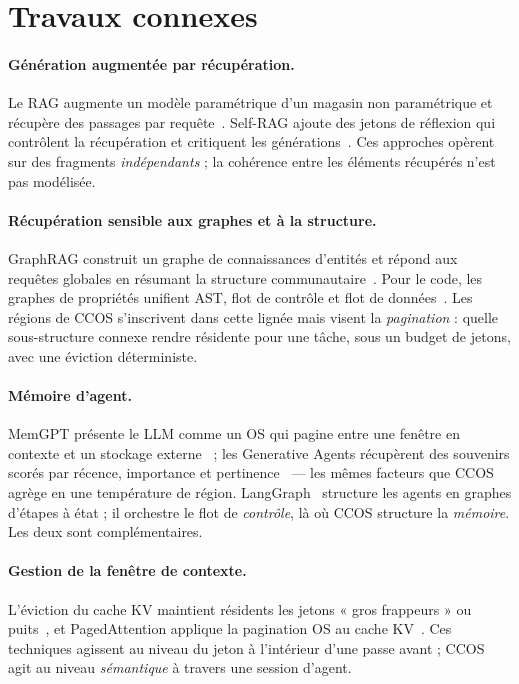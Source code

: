 \documentclass[11pt]{article}
\begin{document}
\section{Travaux connexes}\label{sec:related}

\paragraph{Génération augmentée par récupération.} Le RAG augmente un modèle
paramétrique d'un magasin non paramétrique et récupère des passages par
requête~\cite{lewis2020rag}. Self-RAG ajoute des jetons de réflexion qui contrôlent
la récupération et critiquent les générations~\cite{asai2023selfrag}. Ces approches
opèrent sur des fragments \emph{indépendants} ; la cohérence entre les éléments
récupérés n'est pas modélisée.

\paragraph{Récupération sensible aux graphes et à la structure.} GraphRAG construit
un graphe de connaissances d'entités et répond aux requêtes globales en résumant la
structure communautaire~\cite{edge2024graphrag}. Pour le code, les graphes de
propriétés unifient AST, flot de contrôle et flot de données~\cite{yamaguchi2014cpg}.
Les régions de CCOS s'inscrivent dans cette lignée mais visent la \emph{pagination} :
quelle sous-structure connexe rendre résidente pour une tâche, sous un budget de
jetons, avec une éviction déterministe.

\paragraph{Mémoire d'agent.} MemGPT présente le LLM comme un OS qui pagine entre une
fenêtre en contexte et un stockage externe~\cite{packer2023memgpt} ; les Generative
Agents récupèrent des souvenirs scorés par récence, importance et
pertinence~\cite{park2023generative} --- les mêmes facteurs que CCOS agrège en une
température de région. LangGraph~\cite{langgraph} structure les agents en graphes
d'étapes à état ; il orchestre le flot de \emph{contrôle}, là où CCOS structure la
\emph{mémoire}. Les deux sont complémentaires.

\paragraph{Gestion de la fenêtre de contexte.} L'éviction du cache KV maintient
résidents les jetons « gros frappeurs » ou puits~\cite{liu2023lost}, et
PagedAttention applique la pagination OS au cache KV~\cite{kwon2023paged}. Ces
techniques agissent au niveau du jeton à l'intérieur d'une passe avant ; CCOS agit au
niveau \emph{sémantique} à travers une session d'agent.
\end{document}
